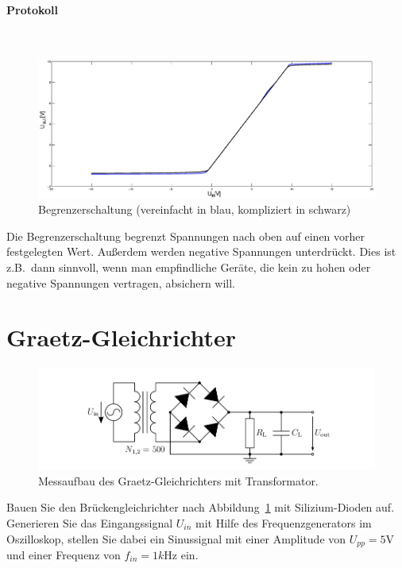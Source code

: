 \documentclass[10pt]{scrreprt}
\begin{document}
    \paragraph{Protokoll}
    $ $
    \begin{figure}[H]
        \includegraphics[width=\textwidth]{SVG/BegrGes}
        \caption{Begrenzerschaltung (vereinfacht in blau, kompliziert in schwarz)}
    \end{figure}

    Die Begrenzerschaltung begrenzt Spannungen nach oben auf einen vorher
    festgelegten Wert. Außerdem werden negative Spannungen unterdrückt. Dies ist
    z.B.~dann sinnvoll, wenn man empfindliche Geräte, die kein zu hohen oder negative
    Spannungen vertragen, absichern will.

    \section{Graetz-Gleichrichter}
    \begin{figure}[H]
        \centering
        \includegraphics[width=\textwidth]{abb15.png}
        \caption{Messaufbau des Graetz-Gleichrichters mit Transformator.}
        \label{fig:abb15}
    \end{figure}
    Bauen Sie den Brückengleichrichter nach Abbildung~\ref{fig:abb15} mit Silizium-Dioden auf.
    Generieren Sie das Eingangssignal $U_{in}$ mit Hilfe des Frequenzgenerators im Oszilloskop, stellen
    Sie dabei ein Sinussignal mit einer Amplitude von $U_{pp} = 5\si{\volt}$ und einer Frequenz von
    $f_{in} = 1\si{k\hertz}$ ein.
\end{document}

